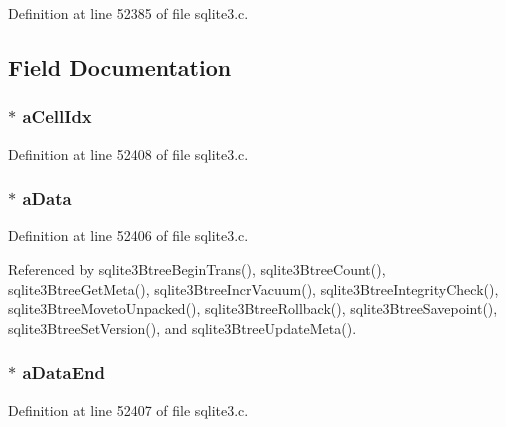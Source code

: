 Definition at line 52385 of file sqlite3.\+c.



\subsection{Field Documentation}
\hypertarget{struct_mem_page_a8f99cccf1b4bf600f3d429e9ea967dc9}{}
\subsubsection[{a\+Cell\+Idx}]{$\ast$ a\+Cell\+Idx}\label{struct_mem_page_a8f99cccf1b4bf600f3d429e9ea967dc9}


Definition at line 52408 of file sqlite3.\+c.

\hypertarget{struct_mem_page_a13132202291db0dcb602d32de00dd312}{}
\subsubsection[{a\+Data}]{$\ast$ a\+Data}\label{struct_mem_page_a13132202291db0dcb602d32de00dd312}


Definition at line 52406 of file sqlite3.\+c.



Referenced by sqlite3\+Btree\+Begin\+Trans(), sqlite3\+Btree\+Count(), sqlite3\+Btree\+Get\+Meta(), sqlite3\+Btree\+Incr\+Vacuum(), sqlite3\+Btree\+Integrity\+Check(), sqlite3\+Btree\+Moveto\+Unpacked(), sqlite3\+Btree\+Rollback(), sqlite3\+Btree\+Savepoint(), sqlite3\+Btree\+Set\+Version(), and sqlite3\+Btree\+Update\+Meta().

\hypertarget{struct_mem_page_a1967815674f08d2a4d3555c654aeafb4}{}
\subsubsection[{a\+Data\+End}]{$\ast$ a\+Data\+End}\label{struct_mem_page_a1967815674f08d2a4d3555c654aeafb4}


Definition at line 52407 of file sqlite3.\+c.



